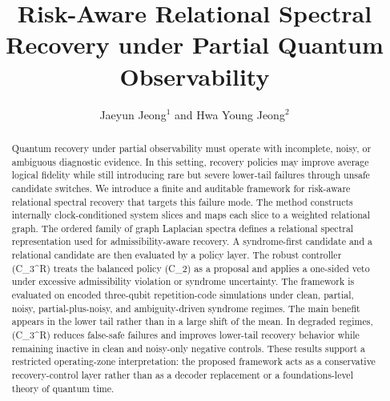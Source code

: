 \documentclass{iopjournal}
\begin{document}

\title{Risk-Aware Relational Spectral Recovery under Partial Quantum Observability}

\author{Jaeyun Jeong$^1$ and Hwa Young Jeong$^2$}





\begin{abstract}
Quantum recovery under partial observability must operate with incomplete, noisy, 
or ambiguous diagnostic evidence. In this setting, recovery policies may improve 
average logical fidelity while still introducing rare but severe lower-tail failures 
through unsafe candidate switches. We introduce a finite and auditable framework 
for risk-aware relational spectral recovery that targets this failure mode.
The method constructs internally clock-conditioned system slices and maps each 
slice to a weighted relational graph. The ordered family of graph Laplacian spectra 
defines a relational spectral representation used for admissibility-aware recovery. 
A syndrome-first candidate and a relational candidate are then evaluated by a policy 
layer. The robust controller (C_3^R) treats the balanced policy (C_2) as a proposal 
and applies a one-sided veto under excessive admissibility violation or syndrome uncertainty.
The framework is evaluated on encoded three-qubit repetition-code simulations under 
clean, partial, noisy, partial-plus-noisy, and ambiguity-driven syndrome regimes. 
The main benefit appears in the lower tail rather than in a large shift of the mean. 
In degraded regimes, (C_3^R) reduces false-safe failures and improves lower-tail recovery 
behavior while remaining inactive in clean and noisy-only negative controls. These results 
support a restricted operating-zone interpretation: the proposed framework acts as a 
conservative recovery-control layer rather than as a decoder replacement or a 
foundations-level theory of quantum time.
\end{abstract}
\end{document}
